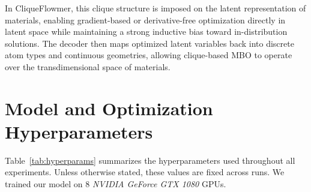 \documentclass{article}
\theoremstyle{plain}
\theoremstyle{definition}
\theoremstyle{remark}
\begin{document}
In CliqueFlowmer, this clique structure is imposed on the latent representation of materials, enabling gradient-based or derivative-free optimization directly in latent space while maintaining a strong inductive bias toward in-distribution solutions. The decoder then maps optimized latent variables back into discrete atom types and continuous geometries, allowing clique-based MBO to operate over the transdimensional space of materials.


\clearpage
\section{Model and Optimization Hyperparameters}
\label{sec:appendix-hparams}

Table~\ref{tab:hyperparams} summarizes the hyperparameters used throughout all experiments. Unless otherwise stated, these values are fixed across runs. 
We trained our model on 8 \emph{NVIDIA GeForce GTX 1080} GPUs.
\end{document}
